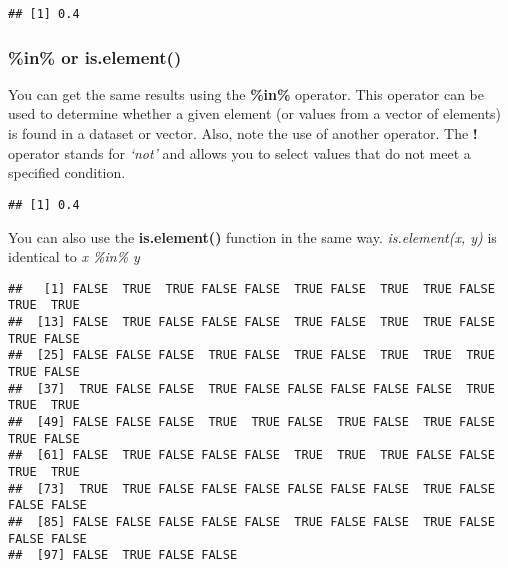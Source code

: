 \documentclass[
]{article}
\newenvironment{Shaded}{\begin{snugshade}}{\end{snugshade}}
\newcommand{\FunctionTok}[1]{\textcolor[rgb]{0.13,0.29,0.53}{\textbf{#1}}}
\newcommand{\NormalTok}[1]{#1}
\newcommand{\OtherTok}[1]{\textcolor[rgb]{0.56,0.35,0.01}{#1}}
\newcommand{\SpecialCharTok}[1]{\textcolor[rgb]{0.81,0.36,0.00}{\textbf{#1}}}
\newcommand{\StringTok}[1]{\textcolor[rgb]{0.31,0.60,0.02}{#1}}
\begin{document}
\begin{verbatim}
## [1] 0.4
\end{verbatim}

\hypertarget{in-or-is.element}{%
\subsubsection{\%in\% or is.element()}\label{in-or-is.element}}

You can get the same results using the \textbf{\%in\%} operator. This
operator can be used to determine whether a given element (or values
from a vector of elements) is found in a dataset or vector. Also, note
the use of another operator. The \textbf{!} operator stands for
\emph{`not'} and allows you to select values that do not meet a
specified condition.

\begin{Shaded}
\end{Shaded}

\begin{verbatim}
## [1] 0.4
\end{verbatim}

You can also use the \textbf{is.element()} function in the same way.
\emph{is.element(x, y)} is identical to \emph{x \%in\% y}

\begin{Shaded}
\end{Shaded}

\begin{verbatim}
##   [1] FALSE  TRUE  TRUE FALSE FALSE  TRUE FALSE  TRUE  TRUE FALSE  TRUE  TRUE
##  [13] FALSE  TRUE FALSE FALSE FALSE  TRUE FALSE  TRUE  TRUE FALSE  TRUE FALSE
##  [25] FALSE FALSE FALSE  TRUE FALSE  TRUE FALSE  TRUE  TRUE  TRUE  TRUE FALSE
##  [37]  TRUE FALSE FALSE  TRUE FALSE FALSE FALSE FALSE FALSE  TRUE  TRUE  TRUE
##  [49] FALSE FALSE FALSE  TRUE  TRUE FALSE  TRUE FALSE  TRUE FALSE  TRUE FALSE
##  [61] FALSE  TRUE FALSE FALSE FALSE  TRUE  TRUE  TRUE FALSE FALSE  TRUE  TRUE
##  [73]  TRUE  TRUE FALSE FALSE FALSE FALSE FALSE FALSE  TRUE FALSE FALSE FALSE
##  [85] FALSE FALSE FALSE FALSE FALSE  TRUE FALSE FALSE  TRUE FALSE FALSE FALSE
##  [97] FALSE  TRUE FALSE FALSE
\end{verbatim}
\end{document}
